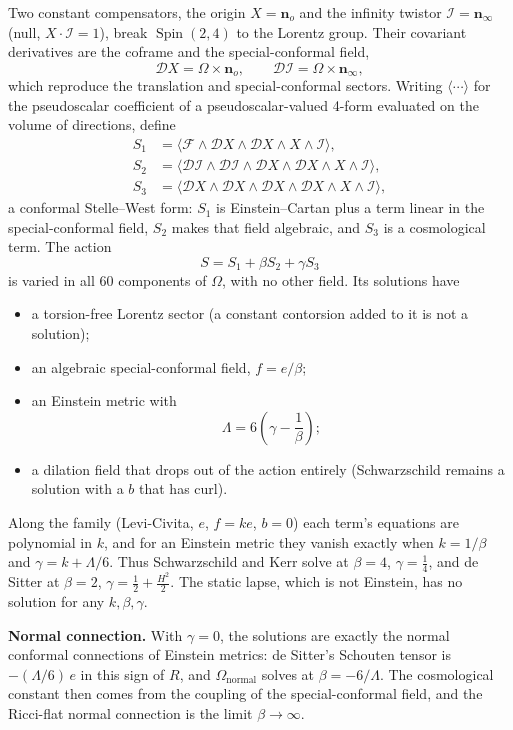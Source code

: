 \documentclass[11pt,a4paper]{article}
\newcommand{\Spin}{\operatorname{Spin}}
\newcommand{\D}{\mathcal{D}}
\newcommand{\F}{\mathcal{F}}
\newcommand{\Om}{\Omega}
\newcommand{\nzero}{\mathbf{n}_o}
\newcommand{\ninf}{\mathbf{n}_\infty}
\newcommand{\cross}{\mathbin{\times}}
\begin{document}
Two constant compensators, the origin \(X=\nzero\) and the infinity
twistor \(\mathcal I=\ninf\) (null, \(X\cdot\mathcal I=1\)), break
\(\Spin(2,4)\) to the Lorentz group. Their covariant derivatives are
the coframe and the special-conformal field,
\[
    \D X=\Om\cross\nzero,
    \qquad
    \D\mathcal I=\Om\cross\ninf,
\]
which reproduce the translation and special-conformal sectors. Writing
\(\langle\cdots\rangle\) for the pseudoscalar coefficient of a
pseudoscalar-valued 4-form evaluated on the volume of directions,
define
\begin{align*}
    S_1&=\bigl\langle \F\wedge\D X\wedge\D X\wedge X\wedge\mathcal I
        \bigr\rangle,\\
    S_2&=\bigl\langle \D\mathcal I\wedge\D\mathcal I\wedge\D X\wedge\D X
        \wedge X\wedge\mathcal I\bigr\rangle,\\
    S_3&=\bigl\langle \D X\wedge\D X\wedge\D X\wedge\D X
        \wedge X\wedge\mathcal I\bigr\rangle,
\end{align*}
a conformal Stelle--West form: \(S_1\) is Einstein--Cartan plus a term
linear in the special-conformal field, \(S_2\) makes that field
algebraic, and \(S_3\) is a cosmological term. The action
\[
    \boxed{
        S=S_1+\beta S_2+\gamma S_3
    }
\]
is varied in all \(60\) components of \(\Om\), with no other field.
Its solutions have
\begin{itemize}
    \item a torsion-free Lorentz sector (a constant contorsion added
    to it is not a solution);
    \item an algebraic special-conformal field, \(f=e/\beta\);
    \item an Einstein metric with
    \[
        \boxed{
            \Lambda=6\left(\gamma-\frac1\beta\right);
        }
    \]
    \item a dilation field that drops out of the action entirely
    (Schwarzschild remains a solution with a \(b\) that has curl).
\end{itemize}
Along the family (Levi-Civita, \(e\), \(f=ke\), \(b=0\)) each term's
equations are polynomial in \(k\), and for an Einstein metric they
vanish exactly when \(k=1/\beta\) and \(\gamma=k+\Lambda/6\). Thus
Schwarzschild and Kerr solve at \(\beta=4\), \(\gamma=\tfrac14\), and
de Sitter at \(\beta=2\), \(\gamma=\tfrac12+\tfrac{H^2}2\). The static
lapse, which is not Einstein, has no solution for any
\(k,\beta,\gamma\).

\textbf{Normal connection.} With \(\gamma=0\), the solutions are
exactly the normal conformal connections of Einstein metrics: de
Sitter's Schouten tensor is \(-(\Lambda/6)\,e\) in this sign of \(R\),
and \(\Om_{\mathrm{normal}}\) solves at \(\beta=-6/\Lambda\). The
cosmological constant then comes from the coupling of the
special-conformal field, and the Ricci-flat normal connection is the
limit \(\beta\to\infty\).
\end{document}
